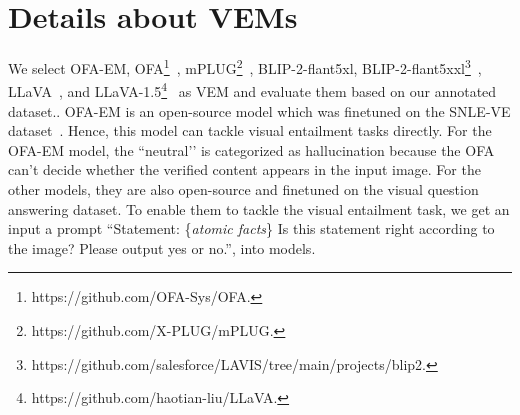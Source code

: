          




\section{Details about VEMs}
\label{devem}
We select OFA-EM, OFA\footnote{https://github.com/OFA-Sys/OFA.}~\cite{ofa}, mPLUG\footnote{https://github.com/X-PLUG/mPLUG.}~\cite{mplug}, BLIP-2-flant5xl, BLIP-2-flant5xxl\footnote{https://github.com/salesforce/LAVIS/tree/main/projects/blip2.}~\cite{blip2}, LLaVA~\cite{llava}, and LLaVA-1.5\footnote{https://github.com/haotian-liu/LLaVA.}~\cite{llava15} as VEM and evaluate them based on our annotated dataset.. OFA-EM is an open-source model which was finetuned on the SNLE-VE dataset~\cite{DBLP:journals/corr/abs-1901-06706}. Hence, this model can tackle visual entailment tasks directly. For the OFA-EM model, the ``neutral’’ is categorized as hallucination because the OFA can't decide whether the verified content appears in the input image. 
For the other models, they are also open-source and finetuned on the visual question answering dataset. To enable them to tackle the visual entailment task, we get an input a prompt ``Statement: \{\textit{atomic facts}\} Is this statement right according to the image? Please output yes or no.'', into models.

